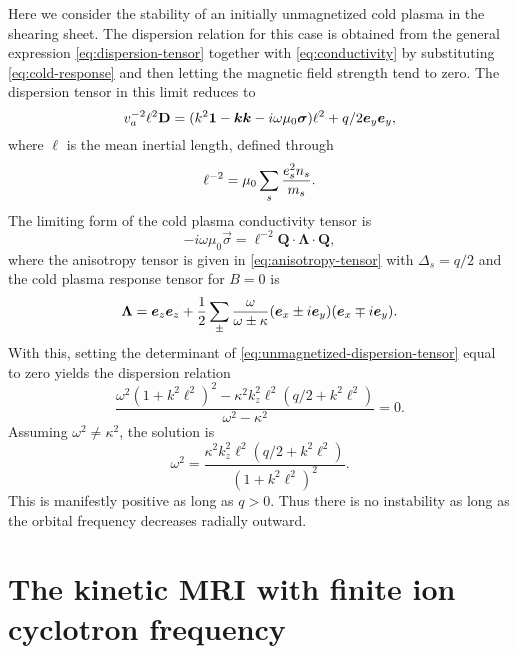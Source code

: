 \documentclass[aps,pre,notitlepage,amsmath,amssymb,amsfonts,nobibnotes,nofootinbib,superscriptaddress]{revtex4-1}
\begin{document}
Here we consider the stability of an initially unmagnetized cold plasma in the
shearing sheet. The dispersion relation for this case is obtained from the
general expression \cref{eq:dispersion-tensor} together with
\cref{eq:conductivity} by substituting \cref{eq:cold-response} and then
letting the magnetic field strength tend to zero. The dispersion tensor in
this limit reduces to
\begin{equation}
  \label{eq:unmagnetized-dispersion-tensor}
  \va^{-2}\ell^2\mathbf{D} =
  (k^2\mathbf{1} - \vec{k}\vec{k} - i\omega\mu_0\vec{\sigma})\ell^2
  + q/2\ey\ey,
\end{equation}
where $\ell$ is the mean inertial length, defined through
\begin{equation}
  \ell^{-2} = \mu_0\sum_s\frac{e_s^2n_s}{m_s}.
\end{equation}
The limiting form of the cold plasma conductivity tensor is
\begin{equation}
  \label{eq:zero-mag-conductivity}
  -i\omega\mu_0\vec{\sigma} =
  \ell^{-2}\mathbf{Q}\cdot\mathbf{\Lambda}\cdot\mathbf{Q},
\end{equation}
where the anisotropy tensor is given in \cref{eq:anisotropy-tensor} with
$\Delta_s=q/2$ and the cold plasma response tensor for $B=0$ is
\begin{equation}
  \label{eq:zero-mag-response}
  \mathbf{\Lambda} = \ez\ez
  + \frac{1}{2}\sum_{\pm}\frac{\omega}{\omega\pm\kappa}
  (\ex\pm i\ey)(\ex\mp i\ey).
\end{equation}
With this, setting the determinant of \cref{eq:unmagnetized-dispersion-tensor}
equal to zero yields the dispersion relation
\begin{equation}
  \frac{\omega^2{(1 + k^2\ell^2)}^2 - \kappa^2 k_z^2\ell^2(q/2 + k^2\ell^2)}
  {\omega^2 - \kappa^2} = 0.
\end{equation}
Assuming $\omega^2\ne\kappa^2$, the solution is
\begin{equation}
  \omega^2 =
  \frac{\kappa^2k_z^2\ell^2(q/2 + k^2\ell^2)}{{(1 + k^2\ell^2)}^2}.
\end{equation}
This is manifestly positive as long as $q>0$. Thus there is no instability as
long as the orbital frequency decreases radially outward.

\section{The kinetic MRI with finite ion cyclotron frequency}
\label{sec:MRI-finite-cyc}
\end{document}
